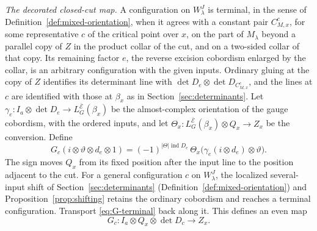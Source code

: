\documentclass[11pt]{amsart}
\theoremstyle{definition}
\theoremstyle{remark}
\theoremstyle{plain}
\numberwithin{equation}{section}
\newcommand{\ind}{\operatorname{ind}}
\begin{document}
\emph{The decorated closed-cut map.} A configuration on $W^J_\lambda$ is
terminal, in the sense of Definition~\ref{def:mixed-orientation}, when it agrees with a constant
pair $C^c_{M,x}$, for some representative $c$ of the critical point over $x$, on the part of
$M_\lambda$ beyond a parallel copy of $Z$ in the product collar of the cut, and on a two-sided
collar of that copy. Its remaining factor $e$, the
reverse excision cobordism enlarged by the collar, is an arbitrary
configuration with the given inputs. Ordinary gluing at the copy of $Z$
identifies its determinant line with $\det D_e\otimes\det D_{C^c_{M,x}}$,
and the lines at $c$ are identified with those at $\beta_x$ as in
Section~\ref{sec:determinants}. Let
$\gamma_e:I_a\otimes\det D_e\to L^{\overline{\mathcal E}}_G(\beta_x)$ be the
almost-complex orientation of the gauge cobordism, with the ordered
inputs, and let
$\Theta_x:L^{\overline{\mathcal E}}_G(\beta_x)\otimes Q_x\to Z_x$ be the
conversion. Define
\begin{equation}\label{eq:G-terminal}
 G_c(i\otimes \vartheta\otimes d_e\otimes1)
 =(-1)^{|\Theta|\ind D_e}\,\Theta_x\bigl(\gamma_e(i\otimes d_e)\otimes \vartheta\bigr).
\end{equation}
The sign moves $Q_x$ from its fixed position after the input line to
the position adjacent to the cut. For a general configuration $c$ on
$W^J_\lambda$, the localized several-input shift of
Section~\ref{sec:determinants} (Definition~\ref{def:mixed-orientation}) and
Proposition~\ref{prop:shifting} retains the ordinary cobordism and reaches a
terminal configuration. Transport \eqref{eq:G-terminal}
back along it. This defines an even map
\begin{equation}\label{eq:G-map}
 G_c:I_a\otimes Q_x\otimes\det D_c\longrightarrow Z_x .
\end{equation}
\end{document}
